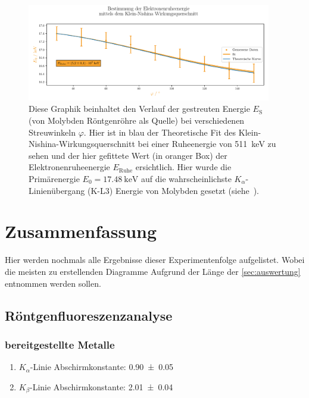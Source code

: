 \documentclass[12pt,english,ngerman]{scrartcl}
\begin{document}
\begin{figure}[H]
	\centering
	\includegraphics[width=0.95\textwidth]{figures/Klein-Nishina-Improved.pdf}
	\caption{Diese Graphik beinhaltet den Verlauf der gestreuten
		Energie $E_\text{S}$ (von Molybden Röntgenröhre als Quelle)
		bei verschiedenen Streuwinkeln $\varphi$.
		Hier ist in blau der Theoretische Fit des Klein-Nishina-Wirkungsquerschnitt
		bei einer Ruheenergie von \SI{511}{\kilo\eV} zu sehen und
		der hier gefittete Wert (in oranger Box) der
		Elektronenruheenergie $E_\text{Ruhe}$ ersichtlich.
		Hier wurde die Primärenergie $E_0=\SI{17.48}{\kilo\eV}$ auf die
		wahrscheinlichste $K_\alpha$-Linienübergang (K-L3) Energie von Molybden gesetzt
		(siehe~\cite{noauthor_x-ray_nodate-1}).
	}\label{fig:Klein-Nishina-Improved}
\end{figure}

\section{Zusammenfassung}\label{sec:zusammenfassung}

Hier werden nochmals alle Ergebnisse dieser Experimentenfolge aufgelistet.
Wobei die meisten zu erstellenden Diagramme Aufgrund der Länge der
\autoref{sec:auswertung} entnommen werden sollen.

\subsection{Röntgenfluoreszenzanalyse}

\subsubsection{bereitgestellte Metalle}

\begin{enumerate}
	\item $K_\alpha$-Linie Abschirmkonstante: \num{0.90(5)}
	\item $K_\beta$-Linie Abschirmkonstante: \num{2.01(4)}
\end{enumerate}
\end{document}
